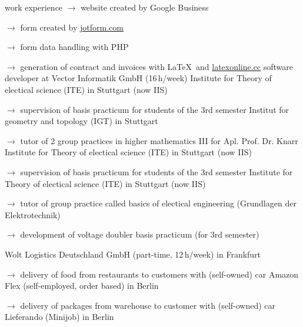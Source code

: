 \begin{rubric}{\textcolor{black!20!blue!100}{work experience}}
			\setlength{\hangindent}{\widthof{$\rightarrow$ }}
			$\rightarrow$ website created by Google Business

			$\rightarrow$ form created by \href{https://www.jotform.com/}{jotform.com}

			$\rightarrow$ form data handling with PHP

			$\rightarrow$ generation of contract and invoices with \LaTeX\ and \href{https://latexonline.cc/}{latexonline.cc}
%			
		\entry*[05/2016 --- 10/2017]
			software developer at Vector Informatik GmbH (16\,h/week)
		\entry*[10/2015 --- 03/2016]
			Institute for Theory of electical science (ITE) in Stuttgart (now IIS)
				
			\setlength{\hangindent}{\widthof{$\rightarrow$ }}
			$\rightarrow$ supervision of basis practicum for students of the 3rd semester
		\entry*
			Institut for geometry and topology (IGT) in Stuttgart
			
			\setlength{\hangindent}{\widthof{$\rightarrow$ }}
			$\rightarrow$ tutor of 2 group practices in higher mathematics III for Apl. Prof. Dr. Knarr
		\entry*[10/2014 --- 03/2015]
			Institute for Theory of electical science (ITE) in Stuttgart (now IIS)
			
			\setlength{\hangindent}{\widthof{$\rightarrow$ }}
			$\rightarrow$ supervision of basis practicum for students of the 3rd semester
		\entry*[10/2013 --- 03/2014]
			Institute for Theory of electical science (ITE) in Stuttgart (now IIS)
			
			\setlength{\hangindent}{\widthof{$\rightarrow$ }}
			$\rightarrow$ tutor of group practice called basics of electical engineering (\glqq Grundlagen der Elektrotechnik\grqq)
			
			$\rightarrow$ development of voltage doubler basis practicum (for 3rd semester)
	
		\entry*[06/03/2024 --- 05/03/2025]
			Wolt Logistics Deutschland GmbH (part-time, 12\,h/week) in Frankfurt
			
			\setlength{\hangindent}{\widthof{$\rightarrow$ }}
			$\rightarrow$ delivery of food from restaurants to customers with (self-owned) car
		\entry*[09/11/2020 --- 06/2022]
			Amazon Flex (self-employed, order based) in Berlin
			
			\setlength{\hangindent}{\widthof{$\rightarrow$ }}
			$\rightarrow$ delivery of packages from warehouse to customer with (self-owned) car
		\entry*[24/10/2020 --- 04/01/2021]
			Lieferando (Minijob) in Berlin
			

\end{rubric}
